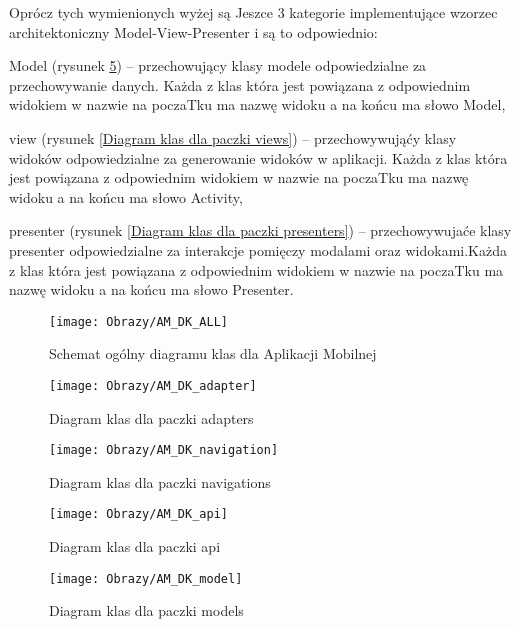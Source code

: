Oprócz tych wymienionych wyżej są Jeszce 3 kategorie implementujące wzorzec architektoniczny Model-View-Presenter i są to odpowiednio:
\begin{itemize*}
	\item Model (rysunek \ref{Diagram klas dla paczki models}) 
				 -- przechowujący klasy modele odpowiedzialne za przechowywanie danych. Każda z klas która jest powiązana z odpowiednim widokiem   w nazwie na poczaTku ma nazwę widoku a na końcu ma słowo Model,   
				\item view 
				(rysunek \ref{Diagram klas dla paczki views}) 
				-- przechowywująćy klasy widoków odpowiedzialne za generowanie widoków w aplikacji. Każda z klas która jest powiązana z odpowiednim widokiem   w nazwie na poczaTku ma nazwę widoku a na końcu ma słowo Activity, 
				\item presenter
				(rysunek \ref{Diagram klas dla paczki presenters}) 
				 -- przechowywujaće klasy presenter odpowiedzialne za interakcje pomięczy modalami oraz widokami.Każda z klas która jest powiązana z odpowiednim widokiem   w nazwie na poczaTku ma nazwę widoku a na końcu ma słowo Presenter.
\end{itemize*}
		\newpage
		\begin{figure}[ht!]
			\centering
			\texttt{[image: Obrazy/AM\_DK\_ALL]}
			\caption{Schemat ogólny diagramu klas dla Aplikacji Mobilnej}
			\label{Schemat ogólny diagramu klas dla Aplikacji mobilnej}
		\end{figure}
	\newpage
		\begin{figure}[ht!]
		\centering
		\texttt{[image: Obrazy/AM\_DK\_adapter]}
		\caption{Diagram klas dla paczki adapters}
		\label{Diagram klas dla paczki adapters}
	\end{figure}
\newpage
		\begin{figure}[ht!]
		\centering
		\texttt{[image: Obrazy/AM\_DK\_navigation]}
		\caption{Diagram klas dla paczki navigations}
		\label{Diagram klas dla paczki navigations}
	\end{figure}
\newpage
	\begin{figure}[ht!]
		\centering
		\texttt{[image: Obrazy/AM\_DK\_api]}
		\caption{Diagram klas dla paczki api}
		\label{Diagram klas dla paczki api}
	\end{figure}
\newpage
	\begin{figure}[ht!]
		\centering
		\texttt{[image: Obrazy/AM\_DK\_model]}
		\caption{Diagram klas dla paczki models}
		\label{Diagram klas dla paczki models}
	\end{figure}


